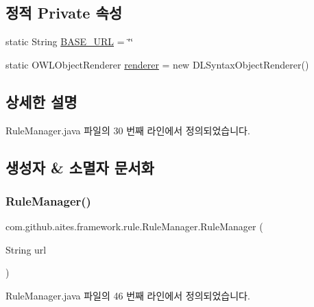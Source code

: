 \subsection*{정적 Private 속성}
\begin{DoxyCompactItemize}
\item 
static String \mbox{\hyperlink{classcom_1_1github_1_1aites_1_1framework_1_1rule_1_1_rule_manager_ac1b9ec84300caaf946326a6c6aa479de}{B\+A\+S\+E\+\_\+\+U\+RL}} = \char`\"{}\char`\"{}
\item 
static O\+W\+L\+Object\+Renderer \mbox{\hyperlink{classcom_1_1github_1_1aites_1_1framework_1_1rule_1_1_rule_manager_ae2bee87a9984ec9463cc7eaa5cc9952f}{renderer}} = new D\+L\+Syntax\+Object\+Renderer()
\end{DoxyCompactItemize}


\subsection{상세한 설명}


Rule\+Manager.\+java 파일의 30 번째 라인에서 정의되었습니다.



\subsection{생성자 \& 소멸자 문서화}
\mbox{\label{classcom_1_1github_1_1aites_1_1framework_1_1rule_1_1_rule_manager_a3411f477cdcd70130bd010a7ab4dac9f}} 
\subsubsection{\texorpdfstring{Rule\+Manager()}{RuleManager()}}
{\footnotesize\ttfamily com.\+github.\+aites.\+framework.\+rule.\+Rule\+Manager.\+Rule\+Manager (\begin{DoxyParamCaption}\item[{String}]{url }\end{DoxyParamCaption})}



Rule\+Manager.\+java 파일의 46 번째 라인에서 정의되었습니다.


